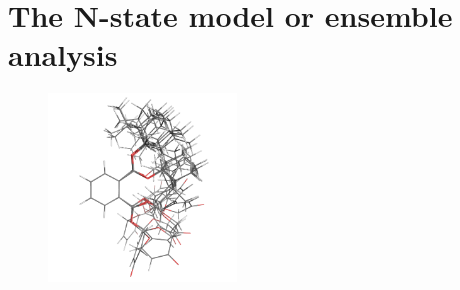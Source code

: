 


\chapter{The N-state model or ensemble analysis} \label{ch: N-state model}


\begin{figure}[h]
  \includegraphics[width=5cm, bb=0 0 1701 1701]{graphics/misc/n_state_model/phthalic_acid_ens_600x600}
\end{figure}


